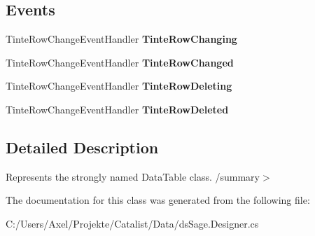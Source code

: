 \subsection*{Events}
\begin{DoxyCompactItemize}
\item 
Tinte\+Row\+Change\+Event\+Handler {\bfseries Tinte\+Row\+Changing}\hypertarget{class_products_1_1_data_1_1ds_sage_1_1_tinte_data_table_ab903931997ead8365d1978e579139c43}{}\label{class_products_1_1_data_1_1ds_sage_1_1_tinte_data_table_ab903931997ead8365d1978e579139c43}

\item 
Tinte\+Row\+Change\+Event\+Handler {\bfseries Tinte\+Row\+Changed}\hypertarget{class_products_1_1_data_1_1ds_sage_1_1_tinte_data_table_ac648a99e08b3de8a6bc07e4b05669a04}{}\label{class_products_1_1_data_1_1ds_sage_1_1_tinte_data_table_ac648a99e08b3de8a6bc07e4b05669a04}

\item 
Tinte\+Row\+Change\+Event\+Handler {\bfseries Tinte\+Row\+Deleting}\hypertarget{class_products_1_1_data_1_1ds_sage_1_1_tinte_data_table_aa190f76a19fad0a9b633bd4e27b50766}{}\label{class_products_1_1_data_1_1ds_sage_1_1_tinte_data_table_aa190f76a19fad0a9b633bd4e27b50766}

\item 
Tinte\+Row\+Change\+Event\+Handler {\bfseries Tinte\+Row\+Deleted}\hypertarget{class_products_1_1_data_1_1ds_sage_1_1_tinte_data_table_a922c174b851d8e15b004606e1e7aeedf}{}\label{class_products_1_1_data_1_1ds_sage_1_1_tinte_data_table_a922c174b851d8e15b004606e1e7aeedf}

\end{DoxyCompactItemize}


\subsection{Detailed Description}
Represents the strongly named Data\+Table class. /summary$>$ 

The documentation for this class was generated from the following file\+:\begin{DoxyCompactItemize}
\item 
C\+:/\+Users/\+Axel/\+Projekte/\+Catalist/\+Data/ds\+Sage.\+Designer.\+cs\end{DoxyCompactItemize}
